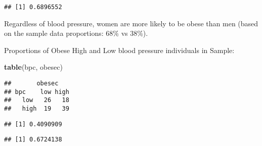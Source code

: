 \documentclass[]{article}
\newenvironment{Shaded}{\begin{snugshade}}{\end{snugshade}}
\newcommand{\KeywordTok}[1]{\textcolor[rgb]{0.13,0.29,0.53}{\textbf{#1}}}
\newcommand{\DecValTok}[1]{\textcolor[rgb]{0.00,0.00,0.81}{#1}}
\newcommand{\StringTok}[1]{\textcolor[rgb]{0.31,0.60,0.02}{#1}}
\newcommand{\CommentTok}[1]{\textcolor[rgb]{0.56,0.35,0.01}{\textit{#1}}}
\newcommand{\OperatorTok}[1]{\textcolor[rgb]{0.81,0.36,0.00}{\textbf{#1}}}
\newcommand{\NormalTok}[1]{#1}
\begin{document}
\begin{Shaded}
\end{Shaded}

\begin{verbatim}
## [1] 0.6896552
\end{verbatim}

Regardless of blood pressure, women are more likely to be obese than men
(based on the sample data proportions: 68\% vs 38\%).

Proportions of Obese High and Low blood pressure individuals in Sample:

\begin{Shaded}
\begin{Highlighting}[]
\KeywordTok{table}\NormalTok{(bpc, obesec)}
\end{Highlighting}
\end{Shaded}

\begin{verbatim}
##       obesec
## bpc    low high
##   low   26   18
##   high  19   39
\end{verbatim}

\begin{Shaded}
\end{Shaded}

\begin{verbatim}
## [1] 0.4090909
\end{verbatim}

\begin{Shaded}
\end{Shaded}

\begin{verbatim}
## [1] 0.6724138
\end{verbatim}
\end{document}
